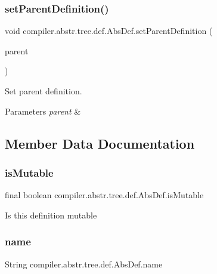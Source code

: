 \subsubsection{\texorpdfstring{set\+Parent\+Definition()}{setParentDefinition()}}
{\footnotesize\ttfamily void compiler.\+abstr.\+tree.\+def.\+Abs\+Def.\+set\+Parent\+Definition (\begin{DoxyParamCaption}\item[{\hyperlink{classcompiler_1_1abstr_1_1tree_1_1def_1_1_abs_def}{Abs\+Def}}]{parent }\end{DoxyParamCaption})}

Set parent definition. 
\begin{DoxyParams}{Parameters}
{\em parent} & \\
\hline
\end{DoxyParams}


\subsection{Member Data Documentation}
\mbox{\label{classcompiler_1_1abstr_1_1tree_1_1def_1_1_abs_def_adf1015b5167218d03ec28a486fcf4b66}} 
\subsubsection{\texorpdfstring{is\+Mutable}{isMutable}}
{\footnotesize\ttfamily final boolean compiler.\+abstr.\+tree.\+def.\+Abs\+Def.\+is\+Mutable}

Is this definition mutable \mbox{\label{classcompiler_1_1abstr_1_1tree_1_1def_1_1_abs_def_ac6bda9377f5abbb5f1be7d3d1b16481b}} 
\subsubsection{\texorpdfstring{name}{name}}
{\footnotesize\ttfamily String compiler.\+abstr.\+tree.\+def.\+Abs\+Def.\+name}

